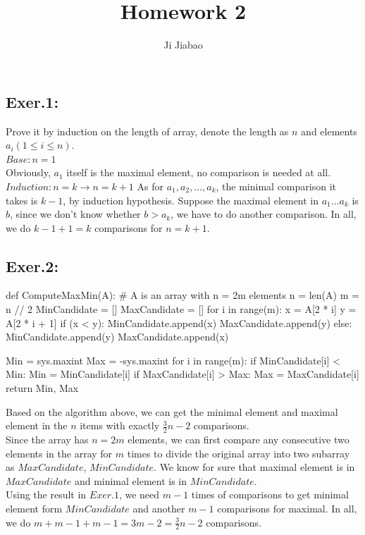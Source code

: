 \documentclass[UTF8]{ctexart}
\begin{document}
 

\title{Homework 2}
\author{Ji Jiabao}
\maketitle

\subsection*{Exer.1:}
Prove it by induction on the length of array, denote the length as $n$ and elements $a_i(1 \leq i \leq n)$.\\
$Base: n = 1$\\
    \hspace*{1em}Obviously, $a_1$ itself is the maximal element, no comparison is needed at all.\\
$Induction: n = k \rightarrow n = k + 1$
    As for $a_1, a_2, ... , a_{k}$, the minimal comparison it takes is $k - 1$, by induction hypothesis.
    Suppose the maximal element in $a_1...a_{k}$ is $b$, since we don't know whether $b > a_k$, we have to
    do another comparison. In all, we do $k - 1 + 1 = k$ comparisons for $n = k + 1$. 

\subsection*{Exer.2:}
\begin{python}
    def ComputeMaxMin(A):
        # A is an array with n = 2m elements
        n = len(A)
        m = n // 2
        MinCandidate = []
        MaxCandidate = []
        for i in range(m):
            x = A[2 * i]
            y = A[2 * i + 1]
            if (x < y):
                MinCandidate.append(x)
                MaxCandidate.append(y)
            else:
                MinCandidate.append(y)
                MaxCandidate.append(x)
        
        Min = sys.maxint
        Max = -sys.maxint
        for i in range(m):
            if MinCandidate[i] < Min:
                Min = MinCandidate[i]
            if MaxCandidate[i] > Max:
                Max = MaxCandidate[i]
        return Min, Max
\end{python}
    \hspace*{1em} Based on the algorithm above, we can get the minimal element and maximal element in the $n$ items
    with exactly $\frac{3}{2} n - 2$ comparisons.\\
    \hspace*{1em} Since the array has $n = 2m$ elements, we can first compare any consecutive two elements in the array
    for $m$ times to divide the original array into two subarray as $MaxCandidate$, $MinCandidate$. We know for sure that
    maximal element is in $MaxCandidate$ and minimal element is in $MinCandidate$.\\
    \hspace*{1em} Using the result in  $Exer.1$, we need $m - 1$ times of comparisons to get minimal element form $MinCandidate$
    and another $m - 1$ comparisons for maximal. In all, we do $m + m - 1 + m - 1 = 3m-2 =\frac{3}{2}n - 2$ comparisons.
\end{document}
